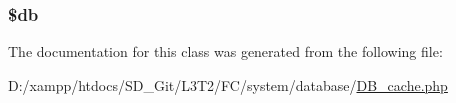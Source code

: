 \subsubsection[{\$db}]{\setlength{\rightskip}{0pt plus 5cm}\$db}\label{class_c_i___d_b___cache_a1fa3127fc82f96b1436d871ef02be319}


The documentation for this class was generated from the following file\+:\begin{DoxyCompactItemize}
\item 
D\+:/xampp/htdocs/\+S\+D\+\_\+\+Git/\+L3\+T2/\+F\+C/system/database/\hyperlink{_d_b__cache_8php}{D\+B\+\_\+cache.\+php}\end{DoxyCompactItemize}
